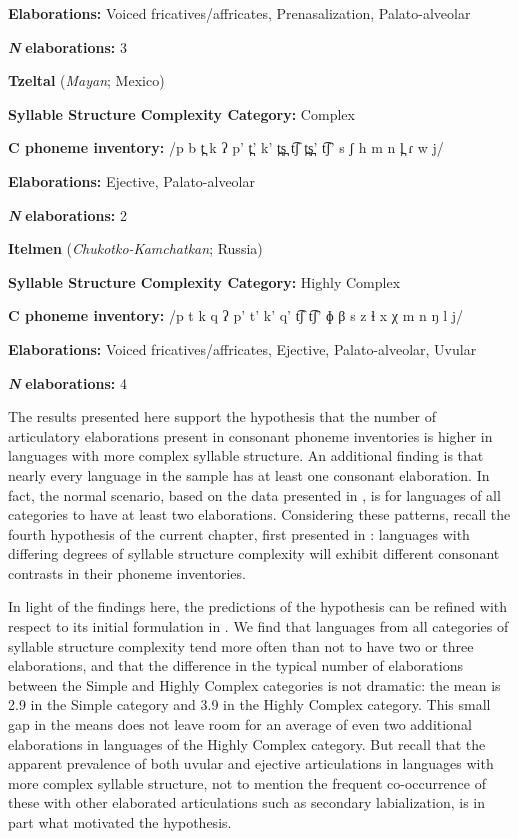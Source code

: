 \textbf{Elaborations:} Voiced fricatives/affricates, Prenasalization, Palato-alveolar

\textbf{\textit{N}} \textbf{elaborations:} 3
\z

\ea\label{ex:4.30}
  \textbf{Tzeltal} (\textit{Mayan}; Mexico)

\textbf{Syllable Structure Complexity Category:} Complex

\textbf{C phoneme inventory:} /p b t̪ k ʔ p’ t̪’ k’ t̪s̪ t͡ʃ t̪s̪’ t͡ʃ’ s ʃ h m n l̪ ɾ w j/ 

\textbf{Elaborations:} Ejective, Palato-alveolar

\textbf{\textit{N}} \textbf{elaborations:} 2
\z

\ea\label{ex:4.31}
  \textbf{Itelmen} (\textit{Chukotko-Kamchatkan}; Russia)

\textbf{Syllable Structure Complexity Category:} Highly Complex

\textbf{C phoneme inventory:} /p t k q ʔ p’ t’ k’ q’ t͡ʃ t͡ʃ’ ɸ β s z ɬ x χ m n ŋ l j/

\textbf{Elaborations:} Voiced fricatives/affricates, Ejective, Palato-alveolar, Uvular 

\textbf{\textit{N}} \textbf{elaborations:} 4
\z

  The results presented here support the hypothesis that the number of articulatory elaborations present in consonant phoneme inventories is higher in languages with more complex syllable structure. An additional finding is that nearly every language in the sample has at least one consonant elaboration. In fact, the normal scenario, based on the data presented in , is for languages of all categories to have at least two elaborations. Considering these patterns, recall the fourth hypothesis of the current chapter, first presented in : languages with differing degrees of syllable structure complexity will exhibit different consonant contrasts in their phoneme inventories.

  In light of the findings here, the predictions of the hypothesis can be refined with respect to its initial formulation in . We find that languages from all categories of syllable structure complexity tend more often than not to have two or three elaborations, and that the difference in the typical number of elaborations between the Simple and Highly Complex categories is not dramatic: the mean is 2.9 in the Simple category and 3.9 in the Highly Complex category. This small gap in the means does not leave room for an average of even two additional elaborations in languages of the Highly Complex category. But recall that the apparent prevalence of both uvular and ejective articulations in languages with more complex syllable structure, not to mention the frequent co-occurrence of these with other elaborated articulations such as secondary labialization, is in part what motivated the hypothesis.

